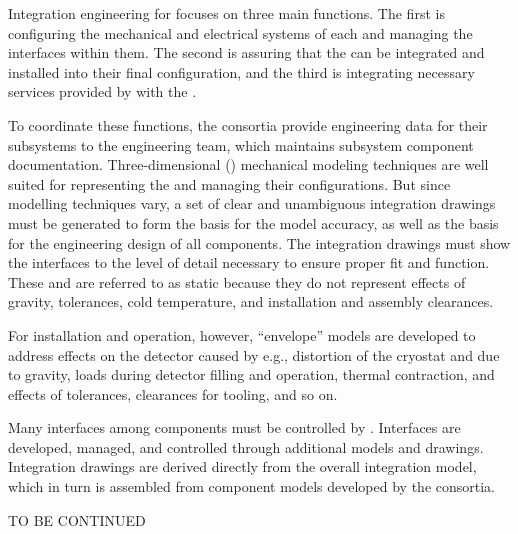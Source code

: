 Integration engineering for  focuses on three main functions. The first is  configuring the
mechanical and electrical systems of each  and managing
the interfaces within them.  The second 
is assuring that the  can be integrated and
installed into their final configuration, and the third is
integrating necessary services provided by  
with the . 

To coordinate these functions, the consortia provide engineering data for their
subsystems to the  engineering team, which maintains subsystem
component documentation.  Three-dimensional (\threed) mechanical modeling techniques are well suited 
for representing the  and managing their configurations.
But since  \threed modelling techniques vary, a set
of clear and unambiguous \twod integration drawings must be generated to form
the basis for the \threed model accuracy, as well as the basis for the engineering
design of all components. The \twod integration drawings must show the 
interfaces to the level of detail necessary to ensure proper fit and function.  These \threed and 
\twod are referred to as static because they do not represent effects of gravity, tolerances, cold
temperature, and installation and assembly clearances.

For installation and operation, however, ``envelope'' models  are developed to 
address effects on the detector 
caused by e.g., distortion of the cryostat and  due to gravity, loads  during 
detector filling and operation, thermal contraction,  and effects of tolerances, clearances for tooling, and so on.

Many interfaces among components must be controlled by . Interfaces are developed, managed, and controlled through additional models and drawings. 
Integration drawings are derived directly from the overall
integration model, which in turn is assembled from
component models developed by the consortia.

TO BE CONTINUED
